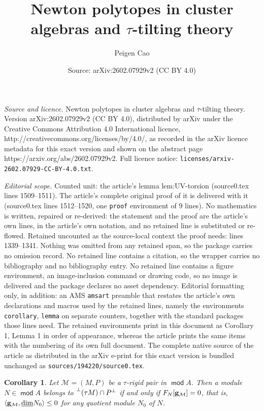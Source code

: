 \documentclass[10pt,a4paper]{amsart}
\title{Newton polytopes in cluster algebras and $\tau$-tilting theory}
\author{Peigen Cao}
\date{Source: arXiv:2602.07929v2 (CC BY 4.0)}
\newtheorem{corollary}{Corollary}
\def\mod{\opname{mod}\nolimits}
\newcommand{\opname}[1]{\operatorname{\mathsf{#1}}}
\begin{document}
\maketitle

\noindent\emph{Source and licence.} Newton polytopes in cluster algebras and $\tau$-tilting theory. Version arXiv:2602.07929v2 (CC BY 4.0), distributed by arXiv under the Creative Commons Attribution 4.0 International licence, http://creativecommons.org/licenses/by/4.0/, as recorded in the arXiv licence metadata for this exact version and shown on the abstract page https://arxiv.org/abs/2602.07929v2. Full licence notice: \texttt{licenses/arxiv-2602.07929-CC-BY-4.0.txt}.\par\smallskip

\noindent\textit{Editorial scope.} Counted unit: the article's lemma lem:UV-torsion (source0.tex lines 1509--1511). The article's complete original proof of it is delivered with it (source0.tex lines 1512--1520, one \texttt{proof} environment of 9 lines). No mathematics is written, repaired or re-derived: the statement and the proof are the article's own lines, in the article's own notation, and no retained line is substituted or re-flowed.  Retained uncounted as the source-local context the proof needs: lines 1339--1341.  Nothing was omitted from any retained span, so the package carries no omission record.  No retained line contains a citation, so the wrapper carries no bibliography and no bibliography entry.  No retained line contains a figure environment, an image-inclusion command or drawing code, so no image is delivered and the package declares no asset dependency.  Editorial formatting only, in addition: an AMS \texttt{amsart} preamble that restates the article's own declarations and macros used by the retained lines, namely the environments \texttt{corollary}, \texttt{lemma} on separate counters, together with the standard packages those lines need.  The retained environments print in this document as Corollary 1, Lemma 1 in order of appearance, whereas the article prints the same items with the numbering of its own full document.  The complete native source of the article as distributed in the arXiv e-print for this exact version is bundled unchanged as \texttt{sources/194220/source0.tex}.
\begin{corollary}\label{cor:dom-hom}
Let $\mathcal M=(M,P)$ be a $\tau$-rigid pair in $\mod A$. Then a module $N\in \mod A$ belongs to   $\prescript{\bot}{}(\tau M)\cap P^{\bot}$ if and only if $F_N[{\bf g}_{\mathcal M}]=0$, that is, $\langle{\bf g}_{\mathcal M},\underline{\dim} N_0\rangle\leq 0$ for any quotient module $N_0$ of $N$.
\end{corollary}
\end{document}
